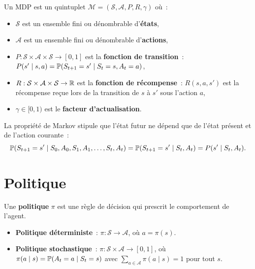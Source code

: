\begin{definition}
Un MDP est un quintuplet $\mathcal{M} = (\mathcal{S}, \mathcal{A}, P, R, \gamma)$ o\`u~:
\begin{itemize}
    \item $\mathcal{S}$ est un ensemble fini ou d\'enombrable d'\textbf{\'etats},
    \item $\mathcal{A}$ est un ensemble fini ou d\'enombrable d'\textbf{actions},
    \item $P : \mathcal{S} \times \mathcal{A} \times \mathcal{S} \to [0,1]$ est la
    \textbf{fonction de transition}~: $P(s' \mid s, a) = \mathbb{P}(S_{t+1} = s' \mid S_t = s, A_t = a)$,
    \item $R : \mathcal{S} \times \mathcal{A} \times \mathcal{S} \to \mathbb{R}$ est la
    \textbf{fonction de r\'ecompense}~: $R(s, a, s')$ est la r\'ecompense re\c{c}ue
    lors de la transition de $s$ \`a $s'$ sous l'action $a$,
    \item $\gamma \in [0, 1)$ est le \textbf{facteur d'actualisation}.
\end{itemize}
\end{definition}

\begin{formules}[title=\textbf{Propri\'et\'e de Markov}]
La propri\'et\'e de Markov stipule que l'\'etat futur ne d\'epend que de l'\'etat
pr\'esent et de l'action courante~:
\[
    \mathbb{P}(S_{t+1} = s' \mid S_0, A_0, S_1, A_1, \ldots, S_t, A_t)
    = \mathbb{P}(S_{t+1} = s' \mid S_t, A_t) = P(s' \mid S_t, A_t).
\]
\end{formules}

\section{Politique}

\begin{definition}[Politique]
Une \textbf{politique} $\pi$ est une r\`egle de d\'ecision qui prescrit le comportement
de l'agent.
\begin{itemize}
    \item \textbf{Politique d\'eterministe}~: $\pi : \mathcal{S} \to \mathcal{A}$,
    o\`u $a = \pi(s)$.
    \item \textbf{Politique stochastique}~: $\pi : \mathcal{S} \times \mathcal{A} \to [0,1]$,
    o\`u $\pi(a \mid s) = \mathbb{P}(A_t = a \mid S_t = s)$ avec
    $\sum_{a \in \mathcal{A}} \pi(a \mid s) = 1$ pour tout $s$.
\end{itemize}
\end{definition}

